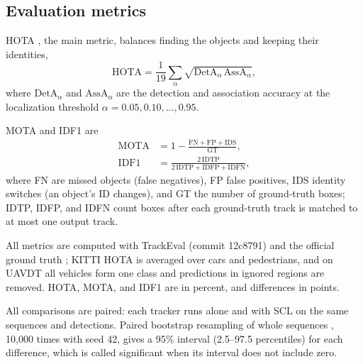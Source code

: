 \documentclass[pdflatex,sn-mathphys-num,iicol]{sn-jnl}
\newcommand{\scl}{SCL}
\begin{document}
\subsection{Evaluation metrics}\label{sec:metrics}
HOTA \cite{luiten2021hota}, the main metric, balances finding the objects and keeping their
identities,
\begin{equation}
\mathrm{HOTA}=\frac{1}{19}\sum_{\alpha}\sqrt{\mathrm{DetA}_\alpha\,\mathrm{AssA}_\alpha},
\label{eq:hota}
\end{equation}
where $\mathrm{DetA}_\alpha$ and $\mathrm{AssA}_\alpha$ are the detection and association accuracy
at the localization threshold $\alpha=0.05,0.10,\dots,0.95$.

MOTA \cite{bernardin2008clear} and
IDF1 \cite{ristani2016idf1} are
\begin{align}
\mathrm{MOTA}&=1-\frac{\mathrm{FN}+\mathrm{FP}+\mathrm{IDS}}{\mathrm{GT}},\label{eq:mota}\\
\mathrm{IDF1}&=\frac{2\,\mathrm{IDTP}}{2\,\mathrm{IDTP}+\mathrm{IDFP}+\mathrm{IDFN}},\label{eq:idf1}
\end{align}
where FN are missed objects (false negatives), FP false positives, IDS identity switches (an
object's ID changes), and GT the number of ground-truth boxes; IDTP, IDFP, and IDFN count boxes
after each ground-truth track is matched to at most one output track.

All metrics are computed
with TrackEval (commit 12c8791) and the official ground truth \cite{dendorfer2021motchallenge};
KITTI HOTA is averaged over cars and pedestrians, and on UAVDT all vehicles form one class and
predictions in ignored regions are removed. HOTA, MOTA, and IDF1 are in percent, and differences
in points.

All comparisons are paired: each tracker runs alone and with \scl{} on the same sequences and
detections. Paired bootstrap resampling of whole sequences \cite{efron1993bootstrap}, 10,000 times
with seed 42, gives a 95\% interval (2.5--97.5 percentiles) for each difference, which is called
significant when its interval does not include zero.
\end{document}
